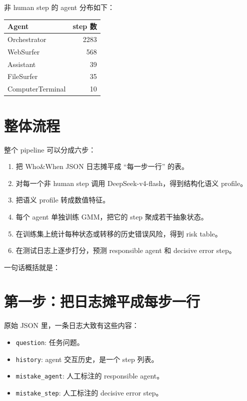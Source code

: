 \documentclass[UTF8,a4paper,11pt]{ctexart}
\begin{document}
非 human step 的 agent 分布如下：

\begin{table}[htbp]
\centering
\begin{tabular}{lr}
\toprule
Agent & step 数 \\
\midrule
Orchestrator & 2283 \\
WebSurfer & 568 \\
Assistant & 39 \\
FileSurfer & 35 \\
ComputerTerminal & 10 \\
\bottomrule
\end{tabular}
\end{table}

\section{整体流程}

整个 pipeline 可以分成六步：

\begin{enumerate}
  \item 把 Who\&When JSON 日志摊平成 ``每一步一行'' 的表。
  \item 对每一个非 human step 调用 DeepSeek-v4-flash，得到结构化语义 profile。
  \item 把语义 profile 转成数值特征。
  \item 每个 agent 单独训练 GMM，把它的 step 聚成若干抽象状态。
  \item 在训练集上统计每种状态或转移的历史错误风险，得到 risk table。
  \item 在测试日志上逐步打分，预测 responsible agent 和 decisive error step。
\end{enumerate}

一句话概括就是：

\begin{center}
\end{center}

\section{第一步：把日志摊平成每步一行}

原始 JSON 里，一条日志大致有这些内容：

\begin{itemize}
  \item \texttt{question}: 任务问题。
  \item \texttt{history}: agent 交互历史，是一个 step 列表。
  \item \texttt{mistake\_agent}: 人工标注的 responsible agent。
  \item \texttt{mistake\_step}: 人工标注的 decisive error step。
\end{itemize}
\end{document}
